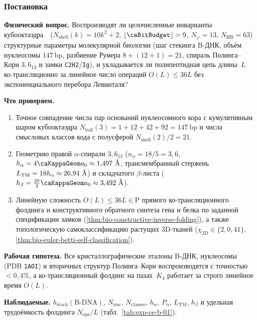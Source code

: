 \label{exp:ceb01}

\subsubsection*{Постановка}
\textbf{Физический вопрос.}
Воспроизводят ли целочисленные инварианты кубооктаэдра~\latGCKshort\ ($N_{\mathrm{shell}}(k)=10k^2+2$, $\lfloor\caBitBudget\rfloor=9$, $N_\varphi=13$, $N_{\mathrm{HB}}=63$) структурные параметры молекулярной биологии (шаг стекинга B-ДНК, объём нуклеосомы $147\ \mathrm{bp}$, разбиение Румера $8+(12+1)=21$, спираль Полинга--Кори $3{,}6_{13}$ и замки \texttt{C2H2}/\texttt{Ig}), и укладывается ли полипептидная цепь длины~$L$ ко-трансляционно за линейное число операций $O(L) \le 36 L$ без экспоненциального перебора Левинталя?

\textbf{Что проверяем.}
\begin{enumerate}[label=\textbf{(\alph*)},leftmargin=*,itemsep=0.25em]
\item Точное совпадение числа пар оснований нуклеосомного кора с кумулятивным шаром кубооктаэдра $N_{\mathrm{ball}}(3) = 1+12+42+92 = 147\ \mathrm{bp}$ и числа смысловых классов кода с полусферой $N_{\mathrm{shell}}(2)/2 = 21$.
\item Геометрию правой $\alpha$-спирали $3{,}6_{13}$ ($n_\alpha = 18/5 = 3{,}6$, $h_\alpha = 4\caKappaGeom a_0 \approx 1{,}497\ \text{\normalfont\AA}$, трансмембранный стержень $L_{\mathrm{TM}} = 18 h_\alpha \approx 26{,}94\ \text{\normalfont\AA}$) и складчатого $\beta$-листа ($h_\beta = \frac{28}{3}\caKappaGeom a_0 \approx 3{,}492\ \text{\normalfont\AA}$).
\item Линейную сложность $O(L) \le 36 L \in \mathrm{P}$ прямого ко-трансляционного фолдинга и конструктивного обратного синтеза гена и белка по заданной спецификации замков (\cref{thm:bio-constructive-inverse-folding}), а также топологическую самоклассификацию растущих 3D-тканей ($\chi_{\mathrm{2D}} \in \{2, 0, 41\}$, \cref{thm:bio-euler-betti-self-classification}).
\end{enumerate}

\textbf{Рабочая гипотеза.}
Все кристаллографические эталоны B-ДНК, нуклеосомы (PDB \texttt{1AOI}) и вторичных структур Полинга--Кори воспроизводятся с точностью $<0{,}4\%$, а ко-трансляционный фолдинг на пазах~$K_4$ работает за строго линейное время $O(L)$.

\textbf{Наблюдаемые.}
$h_{\mathrm{stack}}(\text{B-DNA})$, $N_{\mathrm{nuc}}$, $N_{\mathrm{classes}}$, $h_\alpha$, $P_\alpha$, $L_{\mathrm{TM}}$, $h_\beta$ и удельная трудоёмкость фолдинга $N_{\mathrm{ops}}/L$ (табл.~\ref{tab:exp-ce-b-01}).

